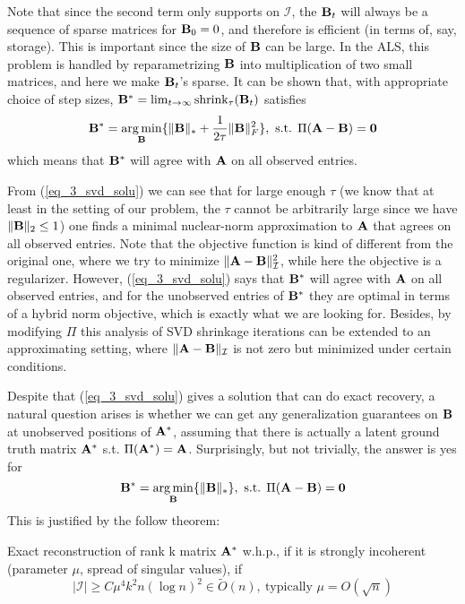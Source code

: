 \documentclass[../main.tex]{subfiles}
\begin{document}
\par Note that since the second term only supports on $\mathcal{I}$, the ${\bf B}_t$ will always be a sequence of sparse matrices for ${\bf B}_0=0$, and therefore is efficient (in terms of, say, storage). This is important since the size of ${\bf B}$ can be large. In the ALS, this problem is handled by reparametrizing ${\bf B}$ into multiplication of two small matrices, and here we make ${\bf B}_t$'s sparse. It can be shown that, with appropriate choice of step sizes, ${\bf B}^* = \lim_{t\rightarrow\infty}\text{shrink}_{\tau}({\bf B}_t)$ satisfies
\begin{equation}\label{eq_3_svd_solu}
{\bf B}^* =\mathop{\arg\min}_{{\bf B}}\{\|{\bf B}\|_*+\frac{1}{2\tau}\|{\bf B}\|^2_F\},\ \text{s.t. }\Pi({\bf A}-{\bf B})=\bm{0}
\end{equation}
which means that ${\bf B}^*$ will agree with ${\bf A}$ on all observed entries. 
\par From (\ref{eq_3_svd_solu}) we can see that for large enough $\tau$ (we know that at least in the setting of our problem, the $\tau$ cannot be arbitrarily large since we have $\|{\bf B}\|_2\leq 1$) one finds a minimal nuclear-norm approximation to ${\bf A}$ that agrees on all observed entries. Note that the objective function is kind of different from the original one, where we try to minimize $\|{\bf A}-{\bf B}\|_{\mathcal{I}}^2$, while here the objective is a regularizer. However, (\ref{eq_3_svd_solu}) says that ${\bf B}^*$ will agree with ${\bf A}$ on all observed entries, and for the unobserved entries of ${\bf B}^*$ they are optimal in terms of a hybrid norm objective, which is exactly what we are looking for. Besides, by modifying $\Pi$ this analysis of SVD shrinkage iterations can be extended to an approximating setting, where $\|{\bf A}-{\bf B}\|_{\mathcal{I}}$ is not zero but minimized under certain conditions.
\par Despite that (\ref{eq_3_svd_solu}) gives a solution that can do exact recovery, a natural question arises is whether we can get any generalization guarantees on ${\bf B}$ at unobserved positions of ${\bf A^*}$, assuming that there is actually a latent ground truth matrix ${\bf A}^*$ s.t. $\Pi({\bf A}^*)={\bf A}$. Surprisingly, but not trivially, the answer is yes for
\begin{equation}\label{eq_3_gen}
{\bf B}^*=\mathop{\arg \min}_{{\bf B}} \{\|{\bf B}\|_*\},\ \text{s.t. } \Pi({\bf A}-{\bf B})=\bm{0}
\end{equation}
This is justified by the follow theorem:
\begin{theorem}\label{thm_3_gen_guarantee}
	Exact reconstruction of rank k matrix ${\bf A}^*$ w.h.p., if it is strongly incoherent (parameter $\mu$, spread of singular values), if
	\begin{equation*}
	|\mathcal{I}|\geq C\mu^4k^2n(\log n)^2\in \tilde{{O}}(n),\ \text{typically }\mu=O(\sqrt{n})
	\end{equation*}
\end{theorem}
\end{document}
